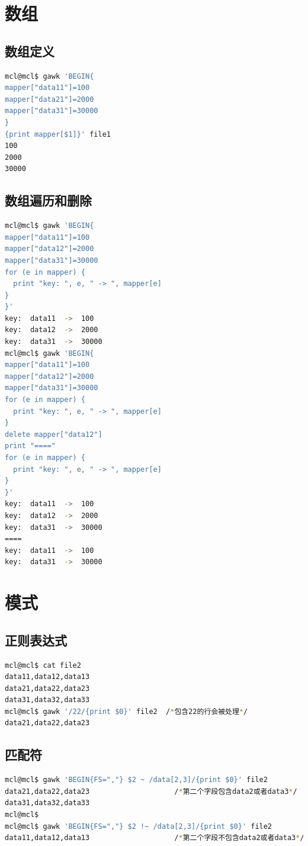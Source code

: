 \documentclass{article}
\begin{document}
\section{数组}
\subsection{数组定义}
\begin{lstlisting}[language=bash, caption={3.1}]
mcl@mcl$ gawk 'BEGIN{
mapper["data11"]=100
mapper["data21"]=2000
mapper["data31"]=30000
}
{print mapper[$1]}' file1
100
2000
30000
\end{lstlisting}
\subsection{数组遍历和删除}
\begin{lstlisting}[language=bash, caption={3.2}]
mcl@mcl$ gawk 'BEGIN{
mapper["data11"]=100
mapper["data12"]=2000
mapper["data31"]=30000
for (e in mapper) {
  print "key: ", e, " -> ", mapper[e]
}
}'
key:  data11  ->  100
key:  data12  ->  2000
key:  data31  ->  30000
mcl@mcl$ gawk 'BEGIN{
mapper["data11"]=100
mapper["data12"]=2000
mapper["data31"]=30000
for (e in mapper) {
  print "key: ", e, " -> ", mapper[e]
}
delete mapper["data12"]
print "===="
for (e in mapper) {
  print "key: ", e, " -> ", mapper[e]
}
}'
key:  data11  ->  100
key:  data12  ->  2000
key:  data31  ->  30000
====
key:  data11  ->  100
key:  data31  ->  30000
\end{lstlisting}

\section{模式}

\subsection{正则表达式}
\begin{lstlisting}[language=bash, caption={4.1}]
mcl@mcl$ cat file2
data11,data12,data13
data21,data22,data23
data31,data32,data33
mcl@mcl$ gawk '/22/{print $0}' file2  /*包含22的行会被处理*/
data21,data22,data23
\end{lstlisting}\subsection{匹配符}
\begin{lstlisting}[language=bash, caption={4.2}]
mcl@mcl$ gawk 'BEGIN{FS=","} $2 ~ /data[2,3]/{print $0}' file2
data21,data22,data23                    /*第二个字段包含data2或者data3*/
data31,data32,data33
mcl@mcl$ 
mcl@mcl$ gawk 'BEGIN{FS=","} $2 !~ /data[2,3]/{print $0}' file2
data11,data12,data13                    /*第二个字段不包含data2或者data3*/
\end{lstlisting}
\end{document}
